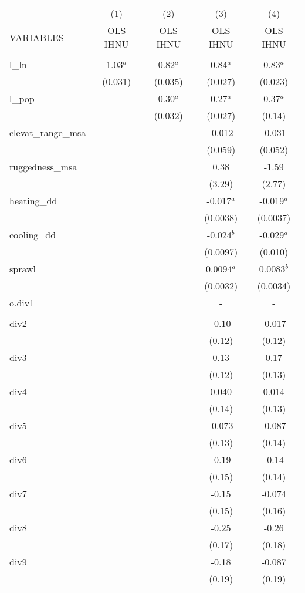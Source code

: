 \documentclass[]{article}
\begin{document}
\begin{tabular}{lcccc} \hline
 & (1) & (2) & (3) & (4) \\
VARIABLES & OLS IHNU & OLS IHNU & OLS IHNU & OLS IHNU \\ \hline
 &  &  &  &  \\
l\_ln & 1.03$^a$ & 0.82$^a$ & 0.84$^a$ & 0.83$^a$ \\
 & (0.031) & (0.035) & (0.027) & (0.023) \\
l\_pop &  & 0.30$^a$ & 0.27$^a$ & 0.37$^a$ \\
 &  & (0.032) & (0.027) & (0.14) \\
elevat\_range\_msa &  &  & -0.012 & -0.031 \\
 &  &  & (0.059) & (0.052) \\
ruggedness\_msa &  &  & 0.38 & -1.59 \\
 &  &  & (3.29) & (2.77) \\
heating\_dd &  &  & -0.017$^a$ & -0.019$^a$ \\
 &  &  & (0.0038) & (0.0037) \\
cooling\_dd &  &  & -0.024$^b$ & -0.029$^a$ \\
 &  &  & (0.0097) & (0.010) \\
sprawl &  &  & 0.0094$^a$ & 0.0083$^b$ \\
 &  &  & (0.0032) & (0.0034) \\
o.div1 &  &  & - & - \\
 &  &  &  &  \\
div2 &  &  & -0.10 & -0.017 \\
 &  &  & (0.12) & (0.12) \\
div3 &  &  & 0.13 & 0.17 \\
 &  &  & (0.12) & (0.13) \\
div4 &  &  & 0.040 & 0.014 \\
 &  &  & (0.14) & (0.13) \\
div5 &  &  & -0.073 & -0.087 \\
 &  &  & (0.13) & (0.14) \\
div6 &  &  & -0.19 & -0.14 \\
 &  &  & (0.15) & (0.14) \\
div7 &  &  & -0.15 & -0.074 \\
 &  &  & (0.15) & (0.16) \\
div8 &  &  & -0.25 & -0.26 \\
 &  &  & (0.17) & (0.18) \\
div9 &  &  & -0.18 & -0.087 \\
 &  &  & (0.19) & (0.19) \\

\end{tabular}
\end{document}
